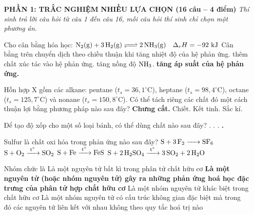 \documentclass[11pt,a4paper]{article}
\begin{document}
\vspace{3pt}
{\bfseries\color{mainGreen} PHẦN 1: TRẮC NGHIỆM NHIỀU LỰA CHỌN (16 câu -- 4 điểm)}
\textit{Thí sinh trả lời câu hỏi từ câu 1 đến câu 16, mỗi câu hỏi thí sinh chỉ chọn một phương án.}
\vspace{4pt}
\begin{ex}
Cho cân bằng hóa học: $\ce{N2(g) + 3H2(g) <=> 2NH3(g)}\quad \Delta_r H = -92\text{ kJ}$
Cân bằng trên chuyển dịch theo chiều thuận khi
\choice
{tăng nhiệt độ của hệ phản ứng.}
{thêm chất xúc tác vào hệ phản ứng.}
{tăng nồng độ $\ce{NH3}$.}
{{\textbf{\color{hfRed}tăng áp suất của hệ phản ứng.}}}
\end{ex}
\begin{ex}
Hỗn hợp X gồm các alkane: pentane ($t_s = 36{,}1^\circ\text{C}$), heptane ($t_s = 98{,}4^\circ\text{C}$), octane ($t_s = 125{,}7^\circ\text{C}$) và nonane ($t_s = 150{,}8^\circ\text{C}$). Có thể tách riêng các chất đó một cách thuận lợi bằng phương pháp nào sau đây?
\choice
{{\textbf{\color{hfRed}Chưng cất.}}}
{Chiết.}
{Kết tinh.}
{Sắc kí.}
\end{ex}
\begin{ex}
Để tạo độ xốp cho một số loại bánh, có thể dùng chất nào sau đây?
\choice
{.}
{.}
{.}
{{\textbf{\color{hfRed}.}}}
\end{ex}
\begin{ex}
Sulfur là chất oxi hóa trong phản ứng nào sau đây?
\choice
{$\ce{S + 3F2 -> SF6}$}
{$\ce{S + O2 ->[t^\circ] SO2}$}
{{\textbf{\color{hfRed}$\ce{S + Fe ->[t^\circ] FeS}$}}}
{$\ce{S + 2H2SO4 ->[t^\circ] 3SO2 + 2H2O}$}
\end{ex}
\begin{ex}
Nhóm chức là
\choice
{Là một nguyên tử bất kì trong phân tử chất hữu cơ}
{{\textbf{\color{hfRed}Là một nguyên tử (hoặc nhóm nguyên tử) gây ra những phản ứng hoá học đặc trưng của phân tử hợp chất hữu cơ}}}
{Là một nhóm nguyên tử khác biệt trong chất hữu cơ}
{Là một nhóm nguyên tử có cấu trúc không gian đặc biệt mà trong đó các nguyên tử liên kết với nhau không theo quy tắc hoá trị nào}
\end{ex}
\end{document}

